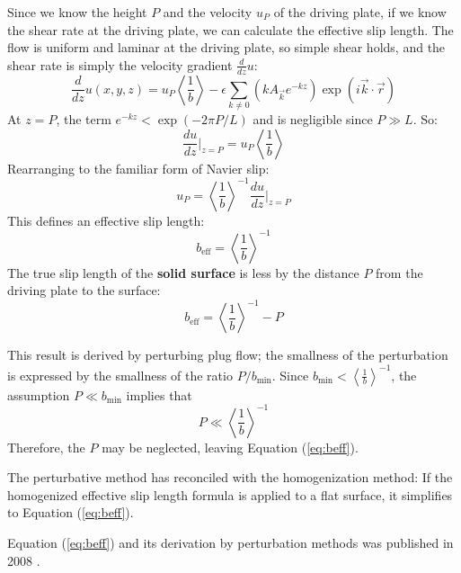 \documentclass[12pt, a4paper, twoside, openright]{book}
\newcommand{\beff}{\ensuremath{b_{\mathrm{eff}}}}
\newcommand{\bmin}{\ensuremath{b_{\mathrm{min}}}}
\begin{document}
Since we know the height $P$ and the velocity $u_P$ of the driving plate, if we know the shear rate at the driving plate, we can calculate the effective slip length.
The flow is uniform and laminar at the driving plate, so simple shear holds, and the shear rate is simply the velocity gradient $\frac{d}{dz} u$:
\begin{equation}
\frac{d}{dz} u(x,y,z) = 
 u_P\left< \frac{1}{b} \right>
 - \epsilon \sum_{k \neq 0} 
\left( k A_{\vec{k}} e^{-kz} \right)
\exp(i \vec{k}\cdot \vec{r})
\end{equation}
At $z = P$, the term $e^{-kz} < \exp ( - 2 \pi P/L )$ and is negligible since $P \gg L$. So:
\begin{equation}
\frac{du}{dz} \rvert_{z=P} = u_P\left< \frac{1}{b} \right>
\end{equation}
Rearranging to the familiar form of Navier slip:
\begin{equation}
 u_P = \left< \frac{1}{b} \right>^{-1} \frac{du}{dz} \rvert_{z=P}
\end{equation}
This defines an effective slip length:
\begin{equation}
\beff = \left< \frac{1}{b} \right>^{-1}
\label{eq:beff}
\end{equation}
The true slip length of the \textbf{solid surface} is less by the distance $P$ from the driving plate to the surface:
\begin{equation}
\beff = \left< \frac{1}{b} \right>^{-1} - P
\end{equation}

This result is derived by perturbing plug flow; the smallness of the perturbation is expressed by the smallness of the ratio $P/ \bmin$.  Since $ \bmin < \left< \frac{1}{b} \right>^{-1}$, the assumption $P \ll \bmin$ implies that
\begin{equation}
P \ll \left< \frac{1}{b} \right>^{-1}
\end{equation}
Therefore, the $P$ may be neglected, leaving Equation (\ref{eq:beff}).

The perturbative method has reconciled with the homogenization method: If the homogenized effective slip length formula is applied to a flat surface, it simplifies to Equation (\ref{eq:beff}).

Equation (\ref{eq:beff}) and its derivation by perturbation methods was published in 2008
 \cite{LundHendy2008}.

\end{document}
